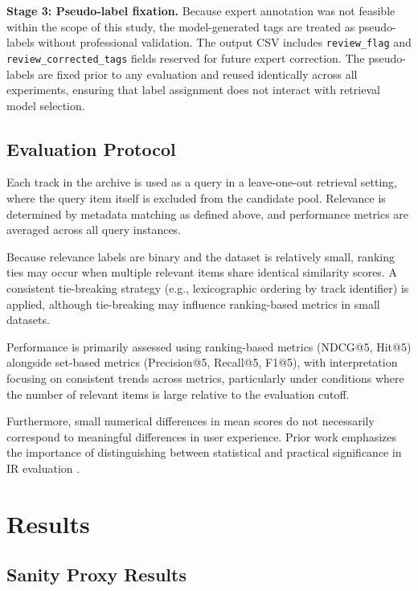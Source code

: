\documentclass{article}
\begin{document}
\textbf{Stage 3: Pseudo-label fixation.}
Because expert annotation was not feasible within the scope of this study, the model-generated
tags are treated as pseudo-labels without professional validation. The output CSV includes
\texttt{review\_flag} and \texttt{review\_corrected\_tags} fields reserved for future expert
correction. The pseudo-labels are fixed prior to any evaluation and reused identically across all
experiments, ensuring that label assignment does not interact with retrieval model selection.

\subsection{Evaluation Protocol}

Each track in the archive is used as a query in a leave-one-out retrieval setting, where the query item itself is excluded from the candidate pool. Relevance is determined by metadata matching as defined above, and performance metrics are averaged across all query instances.

Because relevance labels are binary and the dataset is relatively small, ranking ties may occur when multiple relevant items share identical similarity scores. A consistent tie-breaking strategy (e.g., lexicographic ordering by track identifier) is applied, although tie-breaking may influence ranking-based metrics in small datasets.

Performance is primarily assessed using ranking-based metrics (NDCG@5, Hit@5) alongside set-based metrics (Precision@5, Recall@5, F1@5), with interpretation focusing on consistent trends across metrics, particularly under conditions where the number of relevant items is large relative to the evaluation cutoff.

Furthermore, small numerical differences in mean scores do not necessarily correspond to meaningful differences in user experience. Prior work emphasizes the importance of distinguishing between statistical and practical significance in IR evaluation \cite{urbano2013}.

\section{Results}\label{sec:results}\label{ch:results}

\subsection{Sanity Proxy Results}
\end{document}
